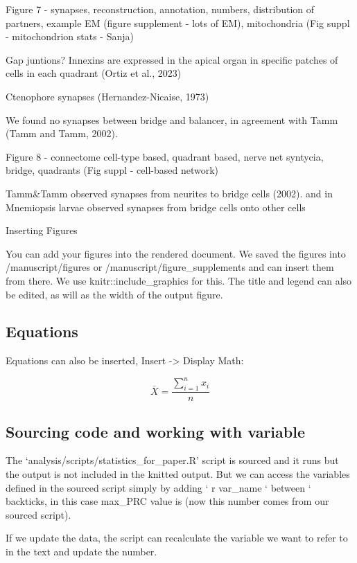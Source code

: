\documentclass[
  11pt,
]{article}
\begin{document}
Figure 7 - synapses, reconstruction, annotation, numbers, distribution
of partners, example EM (figure supplement - lots of EM), mitochondria
(Fig suppl - mitochondrion stats - Sanja)

Gap juntions? Innexins are expressed in the apical organ in specific
patches of cells in each quadrant (Ortiz et al., 2023)

Ctenophore synapses (Hernandez-Nicaise, 1973)

We found no synapses between bridge and balancer, in agreement with Tamm
(Tamm and Tamm, 2002).

Figure 8 - connectome cell-type based, quadrant based, nerve net
syntycia, bridge, quadrants (Fig suppl - cell-based network)

Tamm\&Tamm observed synapses from neurites to bridge cells (2002). and
in Mnemiopsis larvae observed synapses from bridge cells onto other
cells

Inserting Figures

You can add your figures into the rendered document. We saved the
figures into /manuscript/figures or /manuscript/figure\_supplements and
can insert them from there. We use knitr::include\_graphics for this.
The title and legend can also be edited, as will as the width of the
output figure.

\subsection{Equations}\label{equations}

Equations can also be inserted, Insert -\textgreater{} Display Math:

\[
\bar{X} = \frac{\sum_{i=1}^{n} x_{i}}{n}
\]

\subsection{Sourcing code and working with
variable}\label{sourcing-code-and-working-with-variable}

The `analysis/scripts/statistics\_for\_paper.R' script is sourced and it
runs but the output is not included in the knitted output. But we can
access the variables defined in the sourced script simply by adding ` r
var\_name ` between ` backticks, in this case max\_PRC value is (now
this number comes from our sourced script).

If we update the data, the script can recalculate the variable we want
to refer to in the text and update the number.
\end{document}
